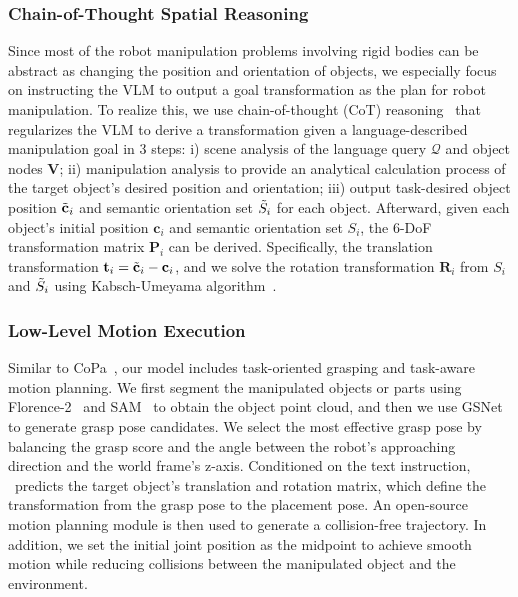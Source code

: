 \subsubsection{Chain-of-Thought Spatial Reasoning}
Since most of the robot manipulation problems involving rigid bodies can be abstract as changing the position and orientation of objects, we especially focus on instructing the VLM to output a goal transformation as the plan for robot manipulation. To realize this, we use chain-of-thought (CoT) reasoning~\cite{CoT22} that regularizes the VLM to derive a transformation given a language-described manipulation goal in 3 steps: 
i) scene analysis of the language query $\mathcal{Q}$ and object nodes $\mathbf{V}$;
ii) manipulation analysis to provide an analytical calculation process of the target object's desired position and orientation;
iii) output task-desired object position $\Tilde{\mathbf{c}}_i$ and semantic orientation set $\Tilde{S}_i$ for each object. Afterward, given each object's initial position $\mathbf{c}_i$ and semantic orientation set $S_i$, the 6-DoF transformation matrix $\mathbf{P}_i$ can be derived.
Specifically, the translation transformation $\mathbf{t}_i = \Tilde{\mathbf{c}}_i-\mathbf{c}_i$, and we solve the rotation transformation $\mathbf{R}_i$ from $S_i$ and  $\Tilde{S}_i$ using Kabsch-Umeyama algorithm~\cite{Kabsch76,Kabsch78,Umeyama1991least}.

\subsubsection{Low-Level Motion Execution}
\label{execution}
Similar to CoPa~\cite{CoPa24}, our model includes task-oriented grasping and task-aware motion planning.
We first segment the manipulated objects or parts using Florence-2~\cite{florence2} and SAM~\cite{SAM23} to obtain the object point cloud, and then we use GSNet~\cite{GraspNet1B20} to generate grasp pose candidates.
We select the most effective grasp pose by balancing the grasp score and the angle between the robot’s approaching direction and the world frame’s z-axis.
Conditioned on the text instruction, \ours~predicts the target object’s translation and rotation matrix, which define the transformation from the grasp pose to the placement pose. An open-source motion planning module \cite{ompl} is then used to generate a collision-free trajectory. In addition, we set the initial joint position as the midpoint to achieve smooth motion while reducing collisions between the manipulated object and the environment.
